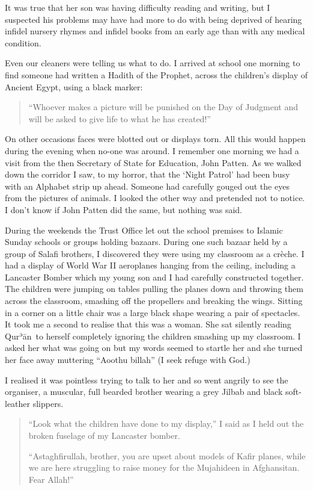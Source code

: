 \documentclass[12pt]{memoir}
\def\´{ʾ} %
\def \Quran{Qur\-\´ān} %
\begin{document}
It was true that her son was having difficulty reading and writing,
but I suspected his problems may have had more to do with being deprived of
hearing infidel nursery rhymes and infidel books
from an early age than with any medical condition.

Even our cleaners were telling us what to do.
I arrived at school one morning to find someone
had written a Hadith of the Prophet,
across the children’s display of Ancient Egypt, using a black marker:

\begin{quote}
“Whoever makes a picture will be punished on the Day of Judgment
and will be asked to give life to what he has created!”
\end{quote}

On other occasions faces were blotted out or displays torn.
All this would happen during the evening when no-one was around.
I remember one morning we had a visit
from the then Secretary of State for Education, John Patten.
As we walked down the corridor I saw, to my horror,
that the ‘Night Patrol’ had been busy with an Alphabet strip up ahead.
Someone had carefully gouged out the eyes from the pictures of animals.
I looked the other way and pretended not to notice.
I don’t know if John Patten did the same, but nothing was said.

During the weekends the Trust Office let out the school premises
to Islamic Sunday schools or groups holding bazaars.
During one such bazaar held by a group of Salafi brothers,
I discovered they were using my classroom as a crèche.
I had a display of World War II aeroplanes hanging from the ceiling,
including a Lancaster Bomber which my young son and I
had carefully constructed together.
The children were jumping on tables pulling the planes down
and throwing them across the classroom,
smashing off the propellers and breaking the wings.
Sitting in a corner on a little chair was a large black shape
wearing a pair of spectacles.
It took me a second to realise that this was a woman.
She sat silently reading \Quran\ to herself
completely ignoring the children smashing up my classroom.
I asked her what was going on but my words seemed
to startle her and she turned her face away
muttering “Aoothu billah” (I seek refuge with God.)

I realised it was pointless trying to talk to her
and so went angrily to see the organiser, a muscular,
full bearded brother wearing a grey Jilbab and black soft-leather slippers.

\begin{quote}
“Look what the children have done to my display,”
I said as I held out the broken fuselage of my Lancaster bomber.

“Astaghfirullah, brother, you are upset about models of Kafir planes,
while we are here struggling to raise money for the Mujahideen in Afghansitan.
Fear Allah!”
\end{quote}
\end{document}
